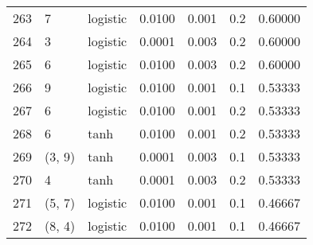 \begin{tabular}{lllrrrr}
263 &           7 &  logistic &  0.0100 &  0.001 &  0.2 &   0.60000 \\
264 &           3 &  logistic &  0.0001 &  0.003 &  0.2 &   0.60000 \\
265 &           6 &  logistic &  0.0100 &  0.003 &  0.2 &   0.60000 \\
266 &           9 &  logistic &  0.0100 &  0.001 &  0.1 &   0.53333 \\
267 &           6 &  logistic &  0.0100 &  0.001 &  0.2 &   0.53333 \\
268 &           6 &      tanh &  0.0100 &  0.001 &  0.2 &   0.53333 \\
269 &      (3, 9) &      tanh &  0.0001 &  0.003 &  0.1 &   0.53333 \\
270 &           4 &      tanh &  0.0001 &  0.003 &  0.2 &   0.53333 \\
271 &      (5, 7) &  logistic &  0.0100 &  0.001 &  0.1 &   0.46667 \\
272 &      (8, 4) &  logistic &  0.0100 &  0.001 &  0.1 &   0.46667 \\
\bottomrule
\end{tabular}
